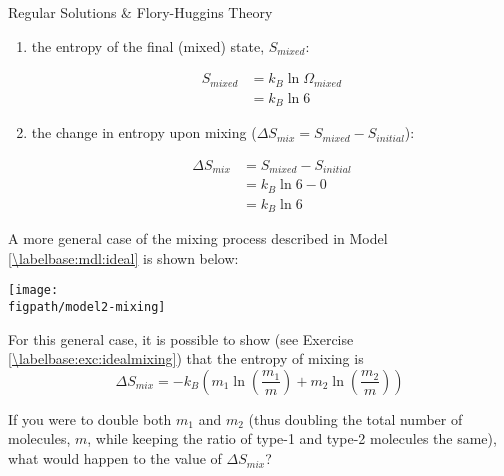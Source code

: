 \begin{activity}{Regular Solutions \& Flory-Huggins Theory}
\begin{ctqs}
\begin{enumerate}
			\item the entropy of the final (mixed) state, $S_{mixed}$:
			
				\begin{solution}[0.75in]{}
					\begin{align*}
						S_{mixed} &= k_B\ln\Omega_{mixed} \\
							&= k_B \ln 6
					\end{align*}
				\end{solution}
				
			\item the change in entropy upon mixing ($\Delta S_{mix} = S_{mixed} - S_{initial}$): 
			
				\begin{solution}[0.75in]{}
					\begin{align*}
						\Delta S_{mix} &= S_{mixed} - S_{initial} \\
							&= k_B \ln 6 - 0\\
							&= k_B \ln 6
					\end{align*}
				\end{solution}
				
		\end{enumerate}
		
\end{ctqs}

\begin{infobox}

	A more general case of the mixing process described in Model \ref{\labelbase:mdl:ideal} is shown below:
	
	\centerline{\texttt{[image: \\figpath/model2-mixing]}}
	
	For this general case, it is possible to show (see Exercise \ref{\labelbase:exc:idealmixing}) that the entropy of mixing is 
	\begin{equation*}
		\Delta S_{mix} = -k_B\left(m_1 \ln\left(\frac{m_1}{m}\right) + m_2 \ln\left(\frac{m_2}{m}\right) \right) \label{\labelbase:eqn:idealS}
	\end{equation*}
\end{infobox}

\begin{ctqs}

	\question If you were to double both $m_1$ and $m_2$ (thus doubling the total number of molecules, $m$, while keeping the ratio of type-1 and type-2 molecules the same), what would happen to the value of $\Delta S_{mix}$?
	
		\begin{solution}[1in]{}
		

\end{solution}
\end{ctqs}
\end{activity}
